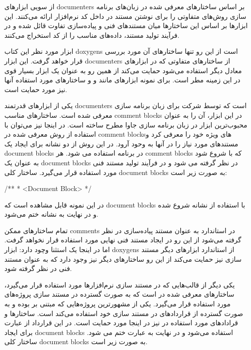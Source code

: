 از سویی ابزارهای \glspl{documenter} بر اساس ساختارهای معرفی شده در زبان‌های
برنامه سازی روش‌های متفاوتی را برای نوشتن مستند در داخل کد نرم‌افزار ارائه
می‌کنند. این ابزارها بر اساس این ساختارها میان مستندهای فنی و پیاده‌سازی تفاوت
قائل شده و در فرآیند تولید مستند، داده‌های مناسب را از کد استخراج می‌کنند.

\begin{note}
ابزار مورد نظر این کتاب \glspl{doxygen} است از این رو تنها ساختارهای آن مورد
بررسی قرار خواهد گرفت. این ابزار \glspl{documenter} از ساختارهای متفاوتی که در
ابزارهای معادل دیگر استفاده می‌شود حمایت می‌کند از همین رو به عنوان یک ابزار
بسیار قوی در این زمینه مطر است. برای نمونه ابزارهای مانند  و
 و ساختارهای مورد استفاده آنها نیز مورد حمایت است.
\end{note}

یکی از ابزارهای قدرتمند \glspl{documenter}  است که توسط شرکت
 برای زبان برنامه سازی  معرفی شده است. ساختارهای
مناسب \glspl{comment block} در این ابزار، آن را به عنوان محبوب‌ترین ابزار در
زبان برنامه سازی جاوا مطرح ساخته است. در اینجا نیز می‌توان با استفاده از روش
معرفی شده در  \glspl{comment block}های ویژه خود را معرفی کرد و
مستند‌های مورد نیاز را در آنها به وحود آرود. 
در این روش از دو نشانه \lr{**} برای ایجاد یک \glspl{document block} 
در برنامه استفاده می شود. هر \glspl{comment block} که با \lr{/**} شروع شود به
عنوان یک \glspl{document block} در نظر گرفته می شود و در فرآیند تولید مستند فنی
مورد استفاده قرار می‌گیرد. ساختار کلی \glspl{document block} به صورت زیر است:

\begin{C++}
/**
 * <Document Block>
 */
\end{C++}

در این نمونه قابل مشاهده است که \glspl{document block} با استفاده از نشانه
\lr{/**} شروع شده و در نهایت به نشانه \lr{*/} ختم می‌شود.

\begin{note}
تمام ساختارهای ممکن \glspl{comment} در استاندارد  به عنوان مستند
پیاده‌سازی در نظر گرفته می‌شود از این رو در ایجاد مستند فنی نهایی مورد استفاده
قرار نخواهد گرفت. اما در اینجا یک استثنا وچود دارد: ابزار \glspl{doxygen} از
استاندارد ابزارهای دیگر مستند سازی نیز حمایت می‌کند از این رو ساختارهای دیگر نیز
وجود دارد که به عنوان مستند فنی در نظر گرفته شود.
\end{note}


یکی دیگر از قالب‌هایی که در مستند سازی نرم‌افزارها مورد استفاده قرار می‌گیرد،
ساختارهای معرفی شده در  است که به صورت گسترده در مستند سازی پروژه‌های
 مورد استفاده قرار می‌گیرد. یکی از مشهورترین پروژه‌هایی که مبتنی بر
 بوده و به صورت گسترده از قراردادهای  در مستند سازی خود استفاده
می‌کند  است. ساختارها و قرادادهای مورد استفاده در  نیز در
اینجا مورد حمایت است. در این قرارداد از عبارت \lr{/*!} برای ایجاد
\glspl{document block} استفاده می‌شود و در نهایت به عبارت \lr{*/} ختم می شود.
ساختار کلی \glspl{document block} به صورت زیر است.

